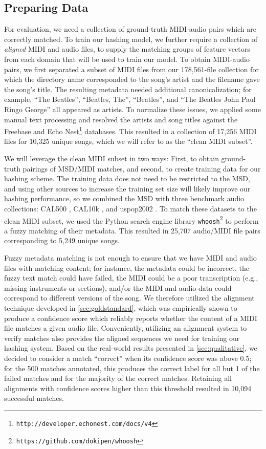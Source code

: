 \subsection{Preparing Data}

For evaluation, we need a collection of ground-truth MIDI-audio pairs which are correctly matched.
To train our hashing model, we further require a collection of {\em aligned} MIDI and audio files, to supply the matching groups of feature vectors from each domain that will be used to train our model.
To obtain MIDI-audio pairs, we first separated a subset of MIDI files from our 178,561-file collection for which the directory name corresponded to the song's artist and the filename gave the song's title.
The resulting metadata needed additional canonicalization; for example, ``The Beatles'', ``Beatles, The'', ``Beatles'', and ``The Beatles John Paul Ringo George'' all appeared as artists.
To normalize these issues, we applied some manual text processing and resolved the artists and song titles against the Freebase \cite{bollacker2008freebase} and Echo Nest\footnote{\texttt{http://developer.echonest.com/docs/v4}} databases.
This resulted in a collection of 17,256 MIDI files for 10,325 unique songs, which we will refer to as the ``clean MIDI subset''.

We will leverage the clean MIDI subset in two ways: First, to obtain ground-truth pairings of MSD/MIDI matches, and second, to create training data for our hashing scheme.
The training data does not need to be restricted to the MSD, and using other sources to increase the training set size will likely improve our hashing performance, so we combined the MSD with three benchmark audio collections: CAL500 \cite{turnbull2007towards}, CAL10k \cite{tingle2010exploring}, and uspop2002 \cite{berenzweig2004large}.
To match these datasets to the clean MIDI subset, we used the Python search engine library \texttt{whoosh}\footnote{\texttt{https://github.com/dokipen/whoosh}} to perform a fuzzy matching of their metadata.
This resulted in 25,707 audio/MIDI file pairs corresponding to 5,249 unique songs.

Fuzzy metadata matching is not enough to ensure that we have MIDI and audio files with matching content; for instance, the metadata could be incorrect, the fuzzy text match could have failed, the MIDI could be a poor transcription (e.g., missing instruments or sections), and/or the MIDI and audio data could correspond to different versions of the song.
We therefore utilized the alignment technique developed in \cref{sec:goldstandard}, which was empirically shown to produce a confidence score which reliably reports whether the content of a MIDI file matches a given audio file.
Conveniently, utilizing an alignment system to verify matches also provides the aligned sequences we need for training our hashing system.
Based on the real-world results presented in \cref{sec:qualitative}, we decided to consider a match ``correct'' when its confidence score was above $0.5$; for the 500 matches annotated, this produces the correct label for all but 1 of the failed matches and for the majority of the correct matches.
Retaining all alignments with confidence scores higher than this threshold resulted in 10,094 successful matches.


